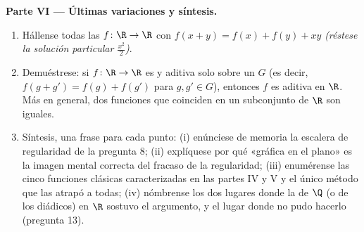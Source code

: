 \begin{problem}[{Problema del fin de semana --- $f(x + y) = f(x) + f(y)$:
la regularidad fuerza la linealidad, y el retrato de los monstruos}]
\medskip
\noindent\textbf{Parte VI --- Últimas variaciones y síntesis.}
\begin{enumerate}[resume]
  \item Hállense todas las $f \colon \R \to \R$  con
        $f(x + y) = f(x) + f(y) + xy$ \emph{(réstese la solución
        particular $\frac{x^2}{2}$)}.
  \item Demuéstrese: si $f \colon \R \to \R$ es  y aditiva
        solo sobre un \emph{ } $G$ (es decir,
        $f(g + g') = f(g) + f(g')$ para $g, g' \in G$), entonces $f$
        es aditiva en $\R$. Más en general, dos funciones 
        que coinciden en un subconjunto  de $\R$ son iguales.
  \item Síntesis, una frase para cada punto: (i) enúnciese de memoria
        la escalera de regularidad de la pregunta 8; (ii) explíquese
        por qué «gráfica  en el plano» es la imagen mental
        correcta del fracaso de la regularidad; (iii) enumérense las
        cinco funciones clásicas caracterizadas en las partes IV y V y
        el único método que las atrapó a todas; (iv) nómbrense los dos
        lugares donde la  de $\Q$ (o de los diádicos) en $\R$
        sostuvo el argumento, y el lugar donde no pudo hacerlo
        (pregunta 13).
\end{enumerate}
\end{problem}
